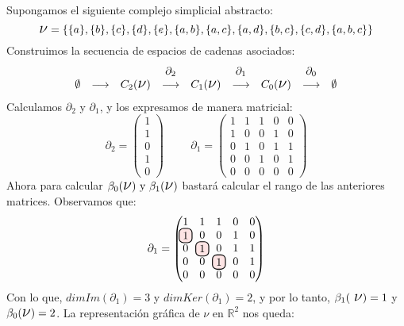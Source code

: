 \documentclass[12pt, a4paper, twoside]{book}
\newcommand\hlightr[1]{\tikz[overlay, remember picture,baseline=-
\the\dimexpr\fontdimen22\textfont2\relax]\node[rectangle,fill=red!50,rounded 
corners,fill opacity = 0.2,draw,thick,text opacity =1] {$#1$};}
\numberwithin{equation}{section}
\theoremstyle{definition}
\newenvironment{ejem}
  {\pushQED{\qed}\renewcommand{\qedsymbol}{$\blacktriangleleft$}\ejemplo}
  {\popQED\endejemplo}
\theoremstyle{remark}
\theoremstyle{plain}
\begin{document}
	\begin{ejem}
		Supongamos el siguiente complejo simplicial abstracto:
		\begin{equation*} 
			\text{{\Large $\nu$}}=\{\{a\},\{b\},\{c\},\{d\},\{e\},
			\{a,b\},\{a,c\},\{a,d\},\{b,c\},\{c,d\},\{a,b,c\}\}
		\end{equation*}
		Construimos la secuencia de espacios de cadenas asociados:
		\begin{equation*}
			 \left.
			\begin{array}{ccccccccc}
				 &  &  & \partial_{2} &  & 
				\partial_{1} &  & \partial_{0} & \\ 
				\emptyset & \longrightarrow & C_{2}(
				\text{{\Large $\nu$}}) & 
				\longrightarrow & C_{1}(\text{{\Large $\nu$}}) 
						& \longrightarrow 
				& C_{0}(\text{{\Large $\nu$}}) & 
				\longrightarrow & \emptyset 
			\end{array}
			\right. 
		\end{equation*}
		Calculamos $\partial_{2}$ y $\partial_{1}$, y los expresamos 
		de manera matricial:
		\begin{equation*}
			\partial_{2}=
			\begin{pmatrix}
			1 \\
			1 \\
			0 \\
			1 \\
			0
			\end{pmatrix}
			\hspace{1cm}
			\partial_{1}=
			\begin{pmatrix}
			1 & 1 & 1 & 0 & 0\\
			1 & 0 & 0 & 1 & 0\\
			0 & 1 & 0 & 1 & 1\\
			0 & 0 & 1 & 0 & 1\\
			0 & 0 & 0 & 0 & 0
			\end{pmatrix}
		\end{equation*}
		Ahora para calcular $\beta_{0}(\text{{\Large $\nu$}}) 
		\text{ y } \beta_{1}(\text{{\Large $\nu$}})$ bastará
		calcular el rango de las anteriores matrices. Observamos que:
		\begin{equation*}
			\partial_{1}=
			\begin{pmatrix}
			1 & 1 & 1 & 0 & 0\\
			\hlightr{1} & 0 & 0 & 1 & 0\\
			0 & \hlightr{1} & 0 & 1 & 1\\
			0 & 0 & \hlightr{1} & 0 & 1\\
			0 & 0 & 0 & 0 & 0
			\end{pmatrix}
		\end{equation*}
		Con lo que, $dimIm(\partial_{1})=3 \text{ y } 
		dimKer(\partial_{1})=2$, y por lo tanto, $\beta_{1}(\text{
		{\Large $\nu$}})=1$ y $\beta_{0}(\text{{\Large $\nu$}})=2$. La
		representación gráfica de {\Large $\nu$} en $\mathbb{R}^{2}$
		nos queda:
		\begin{figure}[H]
			\centering
\end{figure}
\end{ejem}
\end{document}
